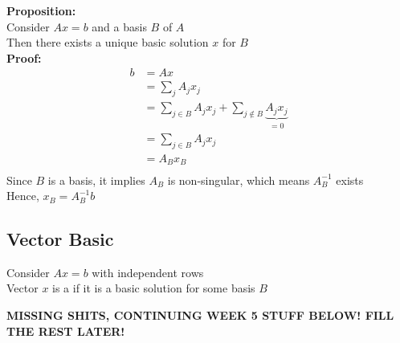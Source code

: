\documentclass[letterpaper, 12pt]{article}
\newcommand{\red}[1]{{\color{red}{#1}}}
\begin{document}
    \pagebreak
    \textbf{Proposition:}\\
    Consider $Ax = b$ and a basis $B$ of $A$\\
    Then there exists a unique basic solution $x$ for $B$\\
    \bigskip
    \textbf{Proof:}\\
    \begin{align*}
        b &= Ax\\
        &= \sum_jA_jx_j\\
        &= \sum_{j \in B}A_jx_j + \sum_{j \notin B}\underbrace{A_jx_j}_{=0}\\
        &= \sum_{j \in B}A_jx_j\\
        &= A_Bx_B\\
    \end{align*}
    Since $B$ is a basis, it implies $A_B$ is non-singular, which means $A_B^{-1}$ exists\\
    Hence, $x_B = A_B^{-1}b$
    \bigbreak
    \subsection{Vector Basic}
    Consider $Ax = b$ with independent rows\\
    Vector $x$ is a \red{basic solution} if it is a basic solution for some basis $B$\\

    \begin{center}
        \textbf{MISSING SHITS, CONTINUING WEEK 5 STUFF BELOW! FILL THE REST LATER!}
    \end{center}
    \pagebreak
\end{document}
